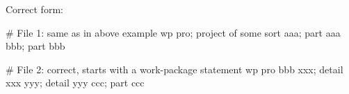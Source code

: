 \documentclass[11pt]{article}
\begin{document}
Correct form:

\begin{inputfile}
# File 1: same as in above example
wp pro; project of some sort
    aaa; part aaa
    bbb; part bbb
\end{inputfile}

\begin{inputfile}
# File 2: correct, starts with a work-package statement
wp pro
    bbb
        xxx; detail xxx
        yyy; detail yyy
    ccc; part ccc
\end{inputfile}
\end{document}
